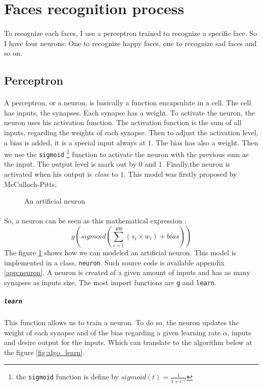\section{Faces recognition process}

\paragraph{}{
    To recognize each faces, I use a perceptron trained to recognize a 
 specific face. So I have four neurons: One to recognize happy faces, one to
 recognize sad faces and so on.
}

\subsection{Perceptron}

\label{par:percep}
\paragraph{}{
    A perceptron, or a neuron, is basically a function encapsulate in a 
 cell. The cell has inputs, the synapses. Each synapse has a weight. To
 activate the neuron, the neuron uses his activation function. The activation
 function is the sum of all inputs, regarding the weights of each synapse.
 Then to adjust the activation level, a bias is added, it is a special
 input always at $1$. The bias has also a weight. Then we use the 
 \texttt{sigmoid} \footnote{ the \texttt{sigmoid} function is define by 
 $sigmoid(t) = \frac{1}{1 + e^{-t}}$} function to activate the neuron with the 
 previous sum as the input. The output level is mark out by $0$ and $1$. 
 Finally,the neuron is activated when his output is \textit{close} to $1$. This
 model was firstly proposed by McCulloch-Pitts\cite{art:mcp}.
}

\begin{figure}[!h]
    \begin{center}
        
    \end{center}
    \caption{\label{fig:neuron} An artificial neuron}
\end{figure}

\paragraph{}{
    So, a neuron can be seen as this mathematical expression :
 \begin{equation}
    g( sigmoid(\sum_{i=1}^{400}(s_i \times w_i) + bias ))
 \end{equation}
 The figure \ref{fig:neuron} shows how we can modeled an artificial neuron.
 This model is implemented in a class, \texttt{neuron}. Such source code is 
 available appendix \ref{app:neuron}. A neuron is created of a given amount of 
 inputs and has as many synapses as inputs size. The most import functions are 
 \texttt{g} and \texttt{learn}.
}
    \subparagraph{\texttt{learn}}{
     This function allows us to train a neuron. To do so, the neuron updates the
 weight of each synapse and of the bias regarding a given learning rate 
 $\alpha$, inputs and desire output for the inputs. Which can translate to the
 algorithm below at the figure \ref{fig:algo_learn}.
}

